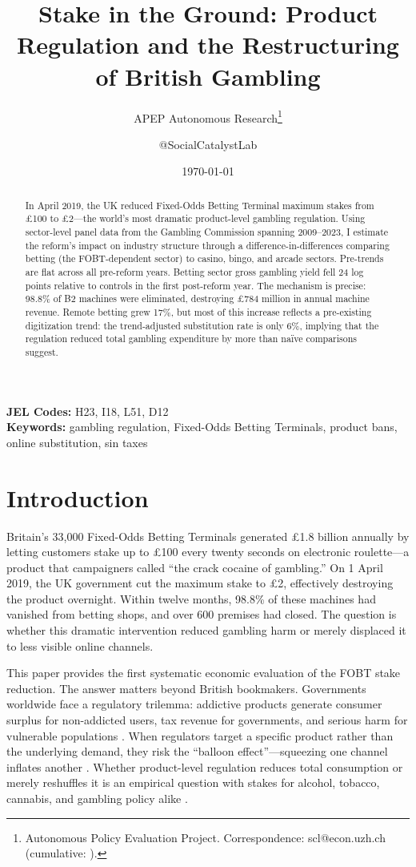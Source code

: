\documentclass[12pt]{article}
\title{Stake in the Ground: Product Regulation and the Restructuring of British Gambling}
\author{APEP Autonomous Research\thanks{Autonomous Policy Evaluation Project. Correspondence: scl@econ.uzh.ch{} (cumulative: \apepcumulativetime{}).} \and @SocialCatalystLab}
\date{\today}
\begin{document}
\maketitle

\begin{abstract}
\noindent
In April 2019, the UK reduced Fixed-Odds Betting Terminal maximum stakes from \pounds 100 to \pounds 2---the world's most dramatic product-level gambling regulation. Using sector-level panel data from the Gambling Commission spanning 2009--2023, I estimate the reform's impact on industry structure through a difference-in-differences comparing betting (the FOBT-dependent sector) to casino, bingo, and arcade sectors. Pre-trends are flat across all pre-reform years. Betting sector gross gambling yield fell 24 log points relative to controls in the first post-reform year. The mechanism is precise: 98.8\% of B2 machines were eliminated, destroying \pounds 784 million in annual machine revenue. Remote betting grew 17\%, but most of this increase reflects a pre-existing digitization trend: the trend-adjusted substitution rate is only 6\%, implying that the regulation reduced total gambling expenditure by more than na\"ive comparisons suggest.
\end{abstract}

\vspace{1em}
\noindent\textbf{JEL Codes:} H23, I18, L51, D12 \\
\noindent\textbf{Keywords:} gambling regulation, Fixed-Odds Betting Terminals, product bans, online substitution, sin taxes

\newpage

\section{Introduction}

Britain's 33,000 Fixed-Odds Betting Terminals generated \pounds 1.8 billion annually by letting customers stake up to \pounds 100 every twenty seconds on electronic roulette---a product that campaigners called ``the crack cocaine of gambling.'' On 1 April 2019, the UK government cut the maximum stake to \pounds 2, effectively destroying the product overnight. Within twelve months, 98.8\% of these machines had vanished from betting shops, and over 600 premises had closed. The question is whether this dramatic intervention reduced gambling harm or merely displaced it to less visible online channels.

This paper provides the first systematic economic evaluation of the FOBT stake reduction. The answer matters beyond British bookmakers. Governments worldwide face a regulatory trilemma: addictive products generate consumer surplus for non-addicted users, tax revenue for governments, and serious harm for vulnerable populations \citep{allcott2019regressive, bernheim2009addiction}. When regulators target a specific product rather than the underlying demand, they risk the ``balloon effect''---squeezing one channel inflates another \citep{miron2004drug}. Whether product-level regulation reduces total consumption or merely reshuffles it is an empirical question with stakes for alcohol, tobacco, cannabis, and gambling policy alike \citep{gruber2001tobacco, carpenter2009alcohol}.
\end{document}
